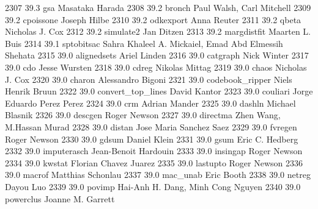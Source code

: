   2307     39.3    gsa           Masataka Harada                         
  2308     39.2    bronch        Paul Walsh, Carl Mitchell               
  2309     39.2    cpoissone     Joseph Hilbe                            
  2310     39.2    odkexport     Anna Reuter                             
  2311     39.2    qbeta         Nicholas J. Cox                         
  2312     39.2    simulate2     Jan Ditzen                              
  2313     39.2    margdistfit   Maarten L. Buis                         
  2314     39.1    sptobitsac    Sahra Khaleel A. Mickaiel, Emad Abd     
                                   Elmessih Shehata                        
  2315     39.0    alignedsets   Ariel Linden                            
  2316     39.0    catgraph      Nick Winter                             
  2317     39.0    cdo           Jesse Wursten                           
  2318     39.0    cdreg         Nikolas Mittag                          
  2319     39.0    chaos         Nicholas J. Cox                         
  2320     39.0    charon        Alessandro Bigoni                       
  2321     39.0    codebook_ripper  Niels Henrik Bruun                      
  2322     39.0    convert_top_lines  David Kantor                            
  2323     39.0    couliari      Jorge Eduardo Perez Perez               
  2324     39.0    crm           Adrian Mander                           
  2325     39.0    dashln        Michael Blasnik                         
  2326     39.0    descgen       Roger Newson                            
  2327     39.0    directma      Zhen Wang, M.Hassan Murad               
  2328     39.0    distan        Jose Maria Sanchez Saez                 
  2329     39.0    fvregen       Roger Newson                            
  2330     39.0    gdsum         Daniel Klein                            
  2331     39.0    gsum          Eric C. Hedberg                         
  2332     39.0    imputerasch   Jean-Benoit Hardouin                    
  2333     39.0    insingap      Roger Newson                            
  2334     39.0    kwstat        Florian Chavez Juarez                   
  2335     39.0    lastupto      Roger Newson                            
  2336     39.0    macrof        Matthias Schonlau                       
  2337     39.0    mac_unab      Eric Booth                              
  2338     39.0    netreg        Dayou Luo                               
  2339     39.0    povimp        Hai-Anh H. Dang, Minh Cong Nguyen       
  2340     39.0    powerclus     Joanne M. Garrett                       
